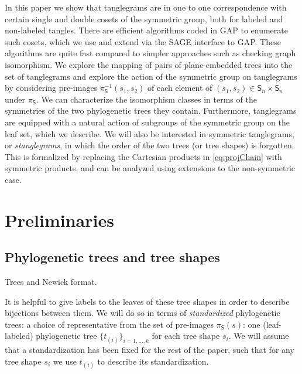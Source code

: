 \documentclass{amsart}
\newcommand{\fS}{\mathfrak S}
\newcommand{\shape}{\mathsf{S}}
\begin{document}
In this paper we show that tanglegrams are in one to one correspondence with certain single and double cosets of the symmetric group, both for labeled and non-labeled tangles.
There are efficient algorithms coded in GAP \cite{GAP4} to enumerate such cosets, which we use and extend via the SAGE \cite{SteinJoyner2005} interface to GAP.
These algorithms are quite fast compared to simpler approaches such as checking graph isomorphism.
We explore the mapping of pairs of plane-embedded trees into the set of tanglegrams and explore the action of the symmetric group on tanglegrams by considering pre-images $\pi_\shape^{-1}(s_1, s_2)$ of each element of $(s_1, s_2) \in \shape_n \times \shape_n$ under $\pi_\shape$.
We can characterize the isomorphism classes in terms of the symmetries of the two phylogenetic trees they contain.
Furthermore, tanglegrams are equipped with a natural action of subgroups of the symmetric group on the leaf set, which we describe.
We will also be interested in symmetric tanglegrams, or \emph{stanglegrams}, in which the order of the two trees (or tree shapes) is forgotten.
This is formalized by replacing the Cartesian products in \eqref{eq:projChain} with symmetric products, and can be analyzed using extensions to the non-symmetric case.


\section{Preliminaries}

\subsection{Phylogenetic trees and tree shapes}
Trees and Newick format.

It is helpful to give labels to the leaves of these tree shapes in order to describe bijections between them.
We will do so in terms of \emph{standardized} phylogenetic trees: a choice of representative from the set of pre-images $\pi_\shape(s)$: one (leaf-labeled) phylogenetic tree $\{t_{(i)}\}_{i=1,\ldots,k}$ for each tree shape $s_i$.
We will assume that a standardization has been fixed for the rest of the paper, such that for any tree shape $s_i$ we use $t_{(i)}$ to describe its standardization.

\end{document}
